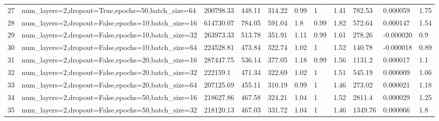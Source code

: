 \begin{longtable}{C{0.8cm} L{2cm} C{1.15cm} C{1.15cm} C{1.15cm} C{1.15cm} C{0.85cm} C{1.25cm} C{1.2cm} C{1.5cm} C{1.0cm}}
27 & num\_layers=2,\newline dropout=True,\newline epochs=50,\newline batch\_size=64 & 200798.33 & 448.11 & 314.22 & 0.99 & 1 & 1.41 & 782.53 & 0.000059 & 1.75 \\
28 & num\_layers=2,\newline dropout=False,\newline epochs=10,\newline batch\_size=16 & 614730.07 & 784.05 & 591.04 & 1.8 & 0.99 & 1.82 & 572.64 & 0.000147 & 1.54 \\
29 & num\_layers=2,\newline dropout=False,\newline epochs=10,\newline batch\_size=32 & 263973.33 & 513.78 & 351.91 & 1.11 & 0.99 & 1.61 & 278.26 & -0.000020 & 0.9 \\
30 & num\_layers=2,\newline dropout=False,\newline epochs=10,\newline batch\_size=64 & 224528.81 & 473.84 & 322.74 & 1.02 & 1 & 1.52 & 140.78 & -0.000018 & 0.89 \\
31 & num\_layers=2,\newline dropout=False,\newline epochs=20,\newline batch\_size=16 & 287447.75 & 536.14 & 377.05 & 1.18 & 0.99 & 1.56 & 1131.2 & 0.000017 & 1.1 \\
32 & num\_layers=2,\newline dropout=False,\newline epochs=20,\newline batch\_size=32 & 222159.1 & 471.34 & 322.69 & 1.02 & 1 & 1.51 & 545.19 & 0.000009 & 1.06 \\
33 & num\_layers=2,\newline dropout=False,\newline epochs=20,\newline batch\_size=64 & 207125.69 & 455.11 & 310.19 & 0.99 & 1 & 1.46 & 273.02 & 0.000021 & 1.18 \\
34 & num\_layers=2,\newline dropout=False,\newline epochs=50,\newline batch\_size=16 & 218627.86 & 467.58 & 324.21 & 1.04 & 1 & 1.52 & 2811.4 & 0.000029 & 1.25 \\
35 & num\_layers=2,\newline dropout=False,\newline epochs=50,\newline batch\_size=32 & 218120.13 & 467.03 & 331.72 & 1.04 & 1 & 1.46 & 1349.76 & 0.000066 & 1.8 \\

\end{longtable}
